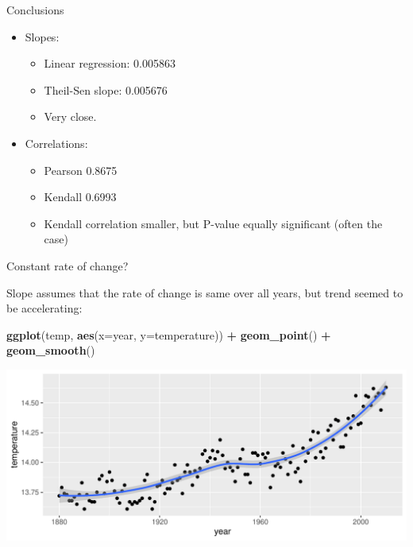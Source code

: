 \documentclass[ignorenonframetext,]{beamer}
\newenvironment{Shaded}{\begin{snugshade}}{\end{snugshade}}
\newcommand{\DataTypeTok}[1]{\textcolor[rgb]{0.13,0.29,0.53}{#1}}
\newcommand{\KeywordTok}[1]{\textcolor[rgb]{0.13,0.29,0.53}{\textbf{#1}}}
\newcommand{\NormalTok}[1]{#1}
\newcommand{\OperatorTok}[1]{\textcolor[rgb]{0.81,0.36,0.00}{\textbf{#1}}}
\newcommand{\StringTok}[1]{\textcolor[rgb]{0.31,0.60,0.02}{#1}}
\providecommand{\tightlist}{%
  \setlength{\itemsep}{0pt}\setlength{\parskip}{0pt}}
\begin{document}
\begin{frame}{Conclusions}
\protect\hypertarget{conclusions-3}{}

\begin{itemize}
\tightlist
\item
  Slopes:

  \begin{itemize}
  \tightlist
  \item
    Linear regression: 0.005863
  \item
    Theil-Sen slope: 0.005676
  \item
    Very close.
  \end{itemize}
\item
  Correlations:

  \begin{itemize}
  \tightlist
  \item
    Pearson 0.8675
  \item
    Kendall 0.6993
  \item
    Kendall correlation smaller, but P-value equally significant (often
    the case)
  \end{itemize}
\end{itemize}

\end{frame}

\begin{frame}[fragile]{Constant rate of change?}
\protect\hypertarget{constant-rate-of-change}{}

Slope assumes that the rate of change is same over all years, but trend
seemed to be accelerating:

\begin{Shaded}
\begin{Highlighting}[]
\KeywordTok{ggplot}\NormalTok{(temp, }\KeywordTok{aes}\NormalTok{(}\DataTypeTok{x=}\NormalTok{year, }\DataTypeTok{y=}\NormalTok{temperature)) }\OperatorTok{+}\StringTok{ }
\StringTok{  }\KeywordTok{geom_point}\NormalTok{() }\OperatorTok{+}\StringTok{ }\KeywordTok{geom_smooth}\NormalTok{()}
\end{Highlighting}
\end{Shaded}

\includegraphics{figure/unnamed-chunk-513-1.pdf}

\end{frame}
\end{document}
